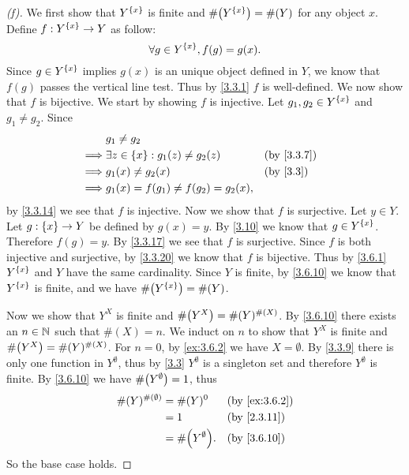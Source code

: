 \begin{proof}[(f)]
	We first show that \(Y^{\left\lbrace x\right\rbrace}\) is finite and \(\#\pa{Y^{\set{x}}} = \#(Y)\) for any object \(x\).
	Define \(f : Y^{\left\lbrace x\right\rbrace} \to Y\) as follow:
	\[
		\forall g \in Y^{\left\lbrace x\right\rbrace}, f(g) = g(x).
	\]
	Since \(g \in Y^{\left\lbrace x\right\rbrace}\) implies \(g(x)\) is an unique object defined in \(Y\), we know that \(f(g)\) passes the vertical line test.
	Thus by \cref{3.3.1} \(f\) is well-defined.
	We now show that \(f\) is bijective.
	We start by showing \(f\) is injective.
	Let \(g_1, g_2 \in Y^{\left\lbrace x\right\rbrace}\) and \(g_1 \neq g_2\).
	Since
	\begin{align*}
		         & g_1 \neq g_2                                               \\
		\implies & \exists z \in \set{x} : g_1(z) \neq g_2(z) &  & \by{3.3.7} \\
		\implies & g_1(x) \neq g_2(x)                         &  & \by{3.3}   \\
		\implies & g_1(x) = f(g_1) \neq f(g_2) = g_2(x),
	\end{align*}
	by \cref{3.3.14} we see that \(f\) is injective.
	Now we show that \(f\) is surjective.
	Let \(y \in Y\).
	Let \(g : \left\lbrace x\right\rbrace \to Y\) be defined by \(g(x) = y\).
	By \cref{3.10} we know that \(g \in Y^{\left\lbrace x\right\rbrace}\).
	Therefore \(f(g) = y\).
	By \cref{3.3.17} we see that \(f\) is surjective.
	Since \(f\) is both injective and surjective, by \cref{3.3.20} we know that \(f\) is bijective.
	Thus by \cref{3.6.1} \(Y^{\left\lbrace x\right\rbrace}\) and \(Y\) have the same cardinality.
	Since \(Y\) is finite, by \cref{3.6.10} we know that \(Y^{\left\lbrace x\right\rbrace}\) is finite, and we have \(\#\pa{Y^{\set{x}}} = \#(Y)\).

	Now we show that \(Y^X\) is finite and \(\#\pa{Y^X} = \#(Y)^{\#(X)}\).
	By \cref{3.6.10} there exists an \(n \in \mathbb{N}\) such that \(\#(X) = n\).
	We induct on \(n\) to show that \(Y^X\) is finite and \(\#\pa{Y^X} = \#(Y)^{\#(X)}\).
	For \(n = 0\), by \cref{ex:3.6.2} we have \(X = \emptyset\).
	By \cref{3.3.9} there is only one function in \(Y^\emptyset\), thus by \cref{3.3} \(Y^\emptyset\) is a singleton set and therefore \(Y^\emptyset\) is finite.
	By \cref{3.6.10} we have \(\#\pa{Y^\emptyset} = 1\), thus
	\begin{align*}
		\#(Y)^{\#(\emptyset)} & = \#(Y)^0             &  & \by{ex:3.6.2} \\
		                      & = 1                   &  & \by{2.3.11}   \\
		                      & = \#\pa{Y^\emptyset}. &  & \by{3.6.10}
	\end{align*}
	So the base case holds.


\end{proof}
